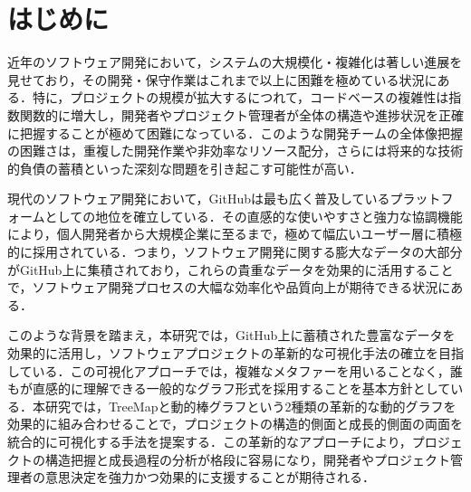 \documentclass[12pt,twoside]{jbook}
\begin{document}
\begin{acknowledgments}



\end{acknowledgments}


\tableofcontents       %

%
%

\listoffigures         %
\listoftables          %


%
%
\chapter{はじめに}
近年のソフトウェア開発において，システムの大規模化・複雑化は著しい進展を見せており，その開発・保守作業はこれまで以上に困難を極めている状況にある．特に，プロジェクトの規模が拡大するにつれて，コードベースの複雑性は指数関数的に増大し，開発者やプロジェクト管理者が全体の構造や進捗状況を正確に把握することが極めて困難になっている．このような開発チームの全体像把握の困難さは，重複した開発作業や非効率なリソース配分，さらには将来的な技術的負債の蓄積といった深刻な問題を引き起こす可能性が高い．

現代のソフトウェア開発において，GitHubは最も広く普及しているプラットフォームとしての地位を確立している．その直感的な使いやすさと強力な協調機能により，個人開発者から大規模企業に至るまで，極めて幅広いユーザー層に積極的に採用されている．つまり，ソフトウェア開発に関する膨大なデータの大部分がGitHub上に集積されており，これらの貴重なデータを効果的に活用することで，ソフトウェア開発プロセスの大幅な効率化や品質向上が期待できる状況にある．

このような背景を踏まえ，本研究では，GitHub上に蓄積された豊富なデータを効果的に活用し，ソフトウェアプロジェクトの革新的な可視化手法の確立を目指している．この可視化アプローチでは，複雑なメタファーを用いることなく，誰もが直感的に理解できる一般的なグラフ形式を採用することを基本方針としている．本研究では，TreeMapと動的棒グラフという2種類の革新的な動的グラフを効果的に組み合わせることで，プロジェクトの構造的側面と成長的側面の両面を統合的に可視化する手法を提案する．この革新的なアプローチにより，プロジェクトの構造把握と成長過程の分析が格段に容易になり，開発者やプロジェクト管理者の意思決定を強力かつ効果的に支援することが期待される．
\end{document}
